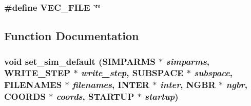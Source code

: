 \subsubsection{\setlength{\rightskip}{0pt plus 5cm}\#define VEC\_\-FILE~\char`\"{}\char`\"{}}\label{input_2md__setsimdef_8c_93c7c63bc0386531b54206dd2195bd73}




\subsection{Function Documentation}
\subsubsection{\setlength{\rightskip}{0pt plus 5cm}void set\_\-sim\_\-default ({\bf SIMPARMS} $\ast$ {\em simparms}, {\bf WRITE\_\-STEP} $\ast$ {\em write\_\-step}, {\bf SUBSPACE} $\ast$ {\em subspace}, {\bf FILENAMES} $\ast$ {\em filenames}, {\bf INTER} $\ast$ {\em inter}, {\bf NGBR} $\ast$ {\em ngbr}, {\bf COORDS} $\ast$ {\em coords}, {\bf STARTUP} $\ast$ {\em startup})}\label{input_2md__setsimdef_8c_d777c0223db2b66ed56581a0dccb8723}


